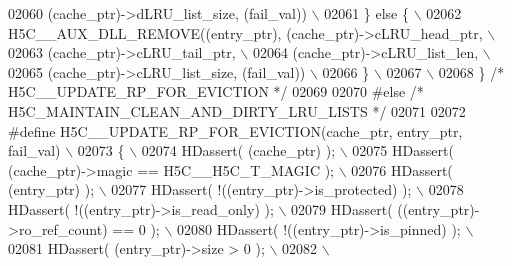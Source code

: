\begin{DoxyCode}
02060 \textcolor{preprocessor}{                            (cache\_ptr)->dLRU\_list\_size, (fail\_val))         \(\backslash\)}
02061 \textcolor{preprocessor}{    \} else \{                                                                 \(\backslash\)}
02062 \textcolor{preprocessor}{        H5C\_\_AUX\_DLL\_REMOVE((entry\_ptr), (cache\_ptr)->cLRU\_head\_ptr,         \(\backslash\)}
02063 \textcolor{preprocessor}{                            (cache\_ptr)->cLRU\_tail\_ptr,                      \(\backslash\)}
02064 \textcolor{preprocessor}{                            (cache\_ptr)->cLRU\_list\_len,                      \(\backslash\)}
02065 \textcolor{preprocessor}{                            (cache\_ptr)->cLRU\_list\_size, (fail\_val))         \(\backslash\)}
02066 \textcolor{preprocessor}{    \}                                                                        \(\backslash\)}
02067 \textcolor{preprocessor}{                                                                             \(\backslash\)}
02068 \textcolor{preprocessor}{\} }\textcolor{comment}{/* H5C\_\_UPDATE\_RP\_FOR\_EVICTION */}\textcolor{preprocessor}{}
02069 
02070 \textcolor{preprocessor}{#else }\textcolor{comment}{/* H5C\_MAINTAIN\_CLEAN\_AND\_DIRTY\_LRU\_LISTS */}\textcolor{preprocessor}{}
02071 
02072 \textcolor{preprocessor}{#define H5C\_\_UPDATE\_RP\_FOR\_EVICTION(cache\_ptr, entry\_ptr, fail\_val)          \(\backslash\)}
02073 \textcolor{preprocessor}{\{                                                                            \(\backslash\)}
02074 \textcolor{preprocessor}{    HDassert( (cache\_ptr) );                                                 \(\backslash\)}
02075 \textcolor{preprocessor}{    HDassert( (cache\_ptr)->magic == H5C\_\_H5C\_T\_MAGIC );                      \(\backslash\)}
02076 \textcolor{preprocessor}{    HDassert( (entry\_ptr) );                                                 \(\backslash\)}
02077 \textcolor{preprocessor}{    HDassert( !((entry\_ptr)->is\_protected) );                                \(\backslash\)}
02078 \textcolor{preprocessor}{    HDassert( !((entry\_ptr)->is\_read\_only) );                                \(\backslash\)}
02079 \textcolor{preprocessor}{    HDassert( ((entry\_ptr)->ro\_ref\_count) == 0 );                            \(\backslash\)}
02080 \textcolor{preprocessor}{    HDassert( !((entry\_ptr)->is\_pinned) );                                   \(\backslash\)}
02081 \textcolor{preprocessor}{    HDassert( (entry\_ptr)->size > 0 );                                       \(\backslash\)}
02082 \textcolor{preprocessor}{                                                                             \(\backslash\)}

\end{DoxyCode}
